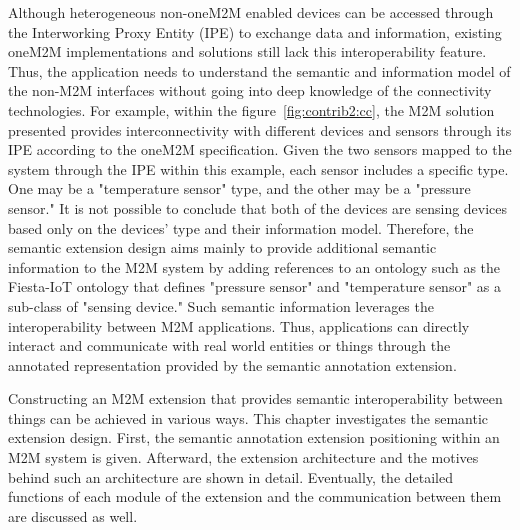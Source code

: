 Although heterogeneous non-oneM2M enabled devices can be accessed through the Interworking Proxy Entity (IPE) to exchange data and information, existing oneM2M implementations and solutions still lack this interoperability feature. Thus, the application needs to understand the semantic and information model of the non-M2M interfaces without going into deep knowledge of the connectivity technologies. For example, within the figure~\ref{fig:contrib2:cc}, the M2M solution presented provides interconnectivity with different devices and sensors through its IPE according to the oneM2M specification. Given the two sensors mapped to the system through the IPE within this example, each sensor includes a specific type. One may be a "temperature sensor" type, and the other may be a "pressure sensor." It is not possible to conclude that both of the devices are sensing devices based only on the devices’ type and their information model. Therefore, the semantic extension design aims mainly to provide additional semantic information to the M2M system by adding references to an ontology such as the Fiesta-IoT ontology that defines "pressure sensor" and "temperature sensor" as a sub-class of "sensing device." Such semantic information leverages the interoperability between M2M applications. Thus, applications can directly interact and communicate with real world entities or things through the annotated representation provided by the semantic annotation extension.\par
Constructing an M2M extension that provides semantic interoperability between things can be achieved in various ways. This chapter investigates the semantic extension design. First, the semantic annotation extension positioning within an M2M system is given. Afterward, the extension architecture and the motives behind such an architecture are shown in detail. Eventually, the detailed functions of each module of the extension and the communication between them are discussed as well.

